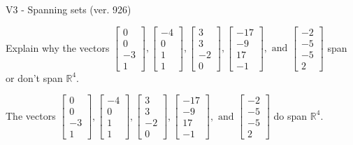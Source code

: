 \begin{exercise}
  \begin{exerciseTitle}V3 - Spanning sets (ver. 926)\end{exerciseTitle}
  \begin{exerciseStatement}
    Explain why the vectors \(\left[\begin{array}{r}
0 \\
0 \\
-3 \\
1
\end{array}\right] , \left[\begin{array}{r}
-4 \\
0 \\
1 \\
1
\end{array}\right] , \left[\begin{array}{r}
3 \\
3 \\
-2 \\
0
\end{array}\right] , \left[\begin{array}{r}
-17 \\
-9 \\
17 \\
-1
\end{array}\right] , \text{ and } \left[\begin{array}{r}
-2 \\
-5 \\
-5 \\
2
\end{array}\right]\) span or don't span \(\mathbb{R}^4\). 
	


  \end{exerciseStatement}
  \begin{exerciseAnswer}
   The vectors \(\left[\begin{array}{r}
0 \\
0 \\
-3 \\
1
\end{array}\right] , \left[\begin{array}{r}
-4 \\
0 \\
1 \\
1
\end{array}\right] , \left[\begin{array}{r}
3 \\
3 \\
-2 \\
0
\end{array}\right] , \left[\begin{array}{r}
-17 \\
-9 \\
17 \\
-1
\end{array}\right] , \text{ and } \left[\begin{array}{r}
-2 \\
-5 \\
-5 \\
2
\end{array}\right]\) 
  	 do  
	span \(\mathbb{R}^4\).
  



\end{exerciseAnswer}
\end{exercise}
